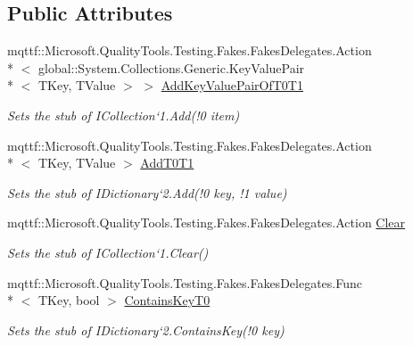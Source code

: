 \subsection*{Public Attributes}
\begin{DoxyCompactItemize}
\item 
mqttf\-::\-Microsoft.\-Quality\-Tools.\-Testing.\-Fakes.\-Fakes\-Delegates.\-Action\\*
$<$ global\-::\-System.\-Collections.\-Generic.\-Key\-Value\-Pair\\*
$<$ T\-Key, T\-Value $>$ $>$ \hyperlink{class_system_1_1_collections_1_1_generic_1_1_fakes_1_1_stub_i_dictionary_3_01_t_key_00_01_t_value_01_4_a50387b80519c420b78cc030fb6c2a9dd}{Add\-Key\-Value\-Pair\-Of\-T0\-T1}
\begin{DoxyCompactList}\small\item\em Sets the stub of I\-Collection`1.Add(!0 item)\end{DoxyCompactList}\item 
mqttf\-::\-Microsoft.\-Quality\-Tools.\-Testing.\-Fakes.\-Fakes\-Delegates.\-Action\\*
$<$ T\-Key, T\-Value $>$ \hyperlink{class_system_1_1_collections_1_1_generic_1_1_fakes_1_1_stub_i_dictionary_3_01_t_key_00_01_t_value_01_4_aa20d657a60f5a11654955164e0560496}{Add\-T0\-T1}
\begin{DoxyCompactList}\small\item\em Sets the stub of I\-Dictionary`2.Add(!0 key, !1 value)\end{DoxyCompactList}\item 
mqttf\-::\-Microsoft.\-Quality\-Tools.\-Testing.\-Fakes.\-Fakes\-Delegates.\-Action \hyperlink{class_system_1_1_collections_1_1_generic_1_1_fakes_1_1_stub_i_dictionary_3_01_t_key_00_01_t_value_01_4_aa29d12e82c2c4698d0556760ce98de2b}{Clear}
\begin{DoxyCompactList}\small\item\em Sets the stub of I\-Collection`1.Clear()\end{DoxyCompactList}\item 
mqttf\-::\-Microsoft.\-Quality\-Tools.\-Testing.\-Fakes.\-Fakes\-Delegates.\-Func\\*
$<$ T\-Key, bool $>$ \hyperlink{class_system_1_1_collections_1_1_generic_1_1_fakes_1_1_stub_i_dictionary_3_01_t_key_00_01_t_value_01_4_a13089f5d838060ec29a16d3d88f307b0}{Contains\-Key\-T0}
\begin{DoxyCompactList}\small\item\em Sets the stub of I\-Dictionary`2.Contains\-Key(!0 key)\end{DoxyCompactList}\item 

\end{DoxyCompactItemize}
